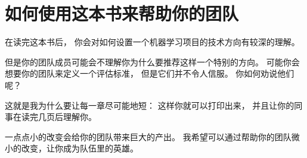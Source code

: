 \chapter{如何使用这本书来帮助你的团队}

\iffalse
After finishing this book, you will have a deep understanding of how to set technical
direction for a machine learning project.
But your teammates might not understand why you’re recommending a particular direction.
Perhaps you want your team to define a single-number evaluation metric, but they aren’t
convinced. How do you persuade them?
That’s why I made the chapters short: So that you can print out and get your teammates to
read just the 1-2 pages you need them to know.
A few changes in prioritization can have a huge effect on your team’s productivity. By helping
your team with a few such changes, I hope that you can become the superhero of your team!
\fi

在读完这本书后，
你会对如何设置一个机器学习项目的技术方向有较深的理解。

但是你的团队成员可能会不理解你为什么要推荐这样一个特别的方向。
可能你会想要你的团队来定义一个评估标准，
但是它们并不令人信服。
你如何劝说他们呢？

这就是我为什么要让每一章尽可能地短：
这样你就可以打印出来，
并且让你的同事在读完几页后理解你。

一点点小的改变会给你的团队带来巨大的产出。
我希望可以通过帮助你的团队微小的改变，让你成为队伍里的英雄。

